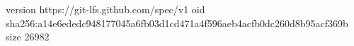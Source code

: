 version https://git-lfs.github.com/spec/v1
oid sha256:a14e6ededc948177045a6fb03d1cd471a4f596aeb4acfb0dc260d8b95acf369b
size 26982
